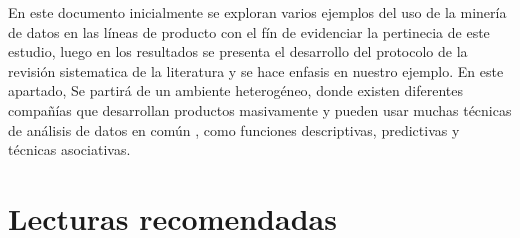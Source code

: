 En este documento inicialmente se exploran varios ejemplos del uso de la minería de datos en las líneas de producto con el fín de evidenciar la pertinecia de este estudio, luego en los resultados se presenta el desarrollo del protocolo de la revisión sistematica de la literatura y se hace enfasis en nuestro ejemplo. En este apartado, Se partirá de un ambiente heterogéneo, donde existen diferentes compañías que desarrollan productos masivamente y pueden usar  muchas técnicas de análisis de datos en común \cite{Thum2014}, como funciones descriptivas, predictivas y técnicas  asociativas. 

\section{Lecturas recomendadas} 

